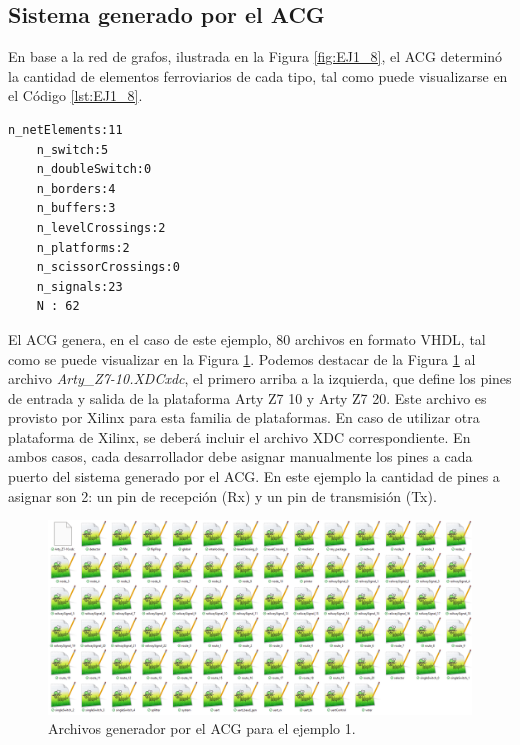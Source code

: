 \subsection{Sistema generado por el ACG}
	\label{sec:EJEMPLO1_ACG}
	
	En base a la red de grafos, ilustrada en la Figura \ref{fig:EJ1_8}, el ACG determinó la cantidad de elementos ferroviarios de cada tipo, tal como puede visualizarse en el Código \ref{lst:EJ1_8}.
	
	\begin{lstlisting}[language = {}, caption = Cantidad de elementos a implementar por el ACG, label = {lst:EJ1_8}]
	n_netElements:11
	n_switch:5
	n_doubleSwitch:0
	n_borders:4
	n_buffers:3
	n_levelCrossings:2
	n_platforms:2
	n_scissorCrossings:0
	n_signals:23
	N : 62
	\end{lstlisting}
	
	El ACG genera, en el caso de este ejemplo, 80 archivos en formato VHDL, tal como se puede visualizar en la Figura \ref{fig:EJ1_ACG_1}. Podemos destacar de la Figura \ref{fig:EJ1_ACG_1} al archivo \textit{Arty\_Z7-10.XDCxdc}, el primero arriba a la izquierda, que define los pines de entrada y salida de la plataforma Arty Z7 10 y Arty Z7 20. Este archivo es provisto por Xilinx para esta familia de plataformas. En caso de utilizar otra plataforma de Xilinx, se deberá incluir el archivo XDC correspondiente. En ambos casos, cada desarrollador debe asignar manualmente los pines a cada puerto del sistema generado por el ACG. En este ejemplo la cantidad de pines a asignar son 2: un pin de recepción (Rx) y un pin de transmisión (Tx).
	
	\begin{figure}[H]
		\centering
		\includegraphics[origin = c, width=1\textwidth]{resultados-obtenidos/ejemplo1/images/ACG_files}
		\centering\caption{Archivos generador por el ACG para el ejemplo 1.}
		\label{fig:EJ1_ACG_1}
	\end{figure}
	
